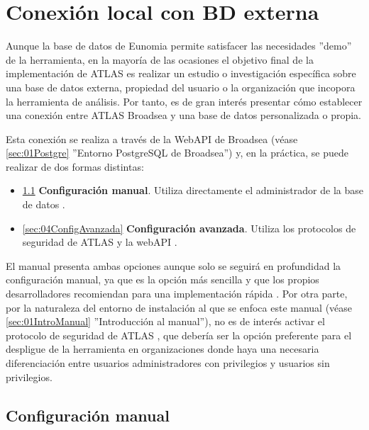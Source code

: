 \chapter{Conexión local con BD externa} \label{cap:04BDEXt}

Aunque la base de datos de Eunomia permite satisfacer las necesidades ''demo'' de la herramienta, en la mayoría de las ocasiones el objetivo final de la implementación de ATLAS es realizar un estudio o investigación específica sobre una base de datos externa, propiedad del usuario o la organización que incopora la herramienta de análisis. Por tanto, es de gran interés presentar cómo establecer una conexión entre ATLAS Broadsea y una base de datos personalizada o propia. 

Esta conexión se realiza a través de la WebAPI de Broadsea (véase \ref{sec:01Postgre} ''Entorno PostgreSQL de Broadsea'') y, en la práctica, se puede realizar de dos formas distintas: 

\begin{itemize}
    \item \ref{sec:04ConfigManual} \textbf{Configuración manual}. Utiliza directamente el administrador de la base de datos . 
    \item \ref{sec:04ConfigAvanzada} \textbf{Configuración avanzada}. Utiliza los protocolos de seguridad de ATLAS y la webAPI .
\end{itemize}

El manual presenta ambas opciones aunque solo se seguirá en profundidad la configuración manual, ya que es la opción más sencilla y que los propios desarrolladores recomiendan para una implementación rápida \cite{forumAddMSDB}. Por otra parte, por la naturaleza del entorno de instalación al que se enfoca este manual (véase \ref{sec:01IntroManual} ''Introducción al manual''), no es de interés activar el protocolo de seguridad de ATLAS , que debería ser la opción preferente para el despligue de la herramienta en organizaciones donde haya una necesaria diferenciación entre usuarios administradores con privilegios y usuarios sin privilegios. 


\section{Configuración manual} \label{sec:04ConfigManual}

